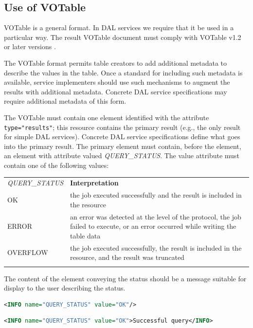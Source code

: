 \documentclass[11pt,letter]{ivoa}
\begin{document}
\subsection{Use of VOTable}
\label{sec:use-votable}
VOTable is a general format. In DAL services we require that it be used in a 
particular way. The result VOTable document must comply with VOTable
v1.2 or later versions
\citep{2019ivoa.spec.1021O}.


The VOTable format permits table creators to add additional metadata to describe 
the values in the table. Once a standard for including such metadata is 
available, service implementers should use such mechanisms to augment the 
results with additional metadata. Concrete DAL service specifications may 
require additional metadata of this form.

The VOTable must contain one   element identified with the attribute 
\verb|type="results"|; this resource contains the primary result (e.g., the only result 
for simple DAL services). Concrete DAL service specifications define what goes 
into the primary result. The primary  element must contain, before the 
 element, an 
 element with attribute  valued \emph{QUERY\_STATUS}. The value 
attribute must contain one of the following values:

\begin{tabular}{l p{8cm}}
\sptablerule
\emph{QUERY\_STATUS}&\textbf{Interpretation}\\
\sptablerule
OK & the job executed successfully and the result is included in the resource \\
ERROR & an error was detected at the level of the protocol, the job failed to 
execute, or an error occurred while writing the table data \\
OVERFLOW & the job executed successfully, the result is included in the 
resource, and the result was truncated \\
\sptablerule
\label{tab:query-status}
\end{tabular}

The content of the  element conveying the status should be a message 
suitable for display to the user describing the status.

\begin{lstlisting}[language=XML]
<INFO name="QUERY_STATUS" value="OK"/>
\end{lstlisting}

\begin{lstlisting}[language=XML]
<INFO name="QUERY_STATUS" value="OK">Successful query</INFO>
\end{lstlisting}
\end{document}
